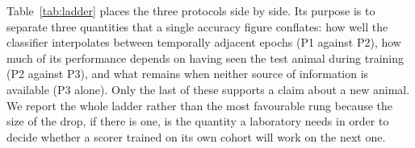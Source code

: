 Table~\ref{tab:ladder} places the three protocols side by side. Its
purpose is to separate three quantities that a single accuracy figure
conflates: how well the classifier interpolates between temporally
adjacent epochs (P1 against P2), how much of its performance depends on
having seen the test animal during training (P2 against P3), and what
remains when neither source of information is available (P3 alone). Only
the last of these supports a claim about a new animal. We report the
whole ladder rather than the most favourable rung because the size of the
drop, if there is one, is the quantity a laboratory needs in order to
decide whether a scorer trained on its own cohort will work on the next
one.


